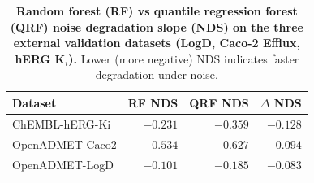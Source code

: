 
\begin{table}[H]
\centering
\caption{\textbf{\SuppFile{} Random forest (RF) vs quantile regression forest (QRF) noise degradation slope (NDS) on the three external validation datasets (LogD, Caco-2 Efflux, hERG K$_i$).}
Lower (more negative) NDS indicates faster degradation under noise.}
\label{supp:rf_vs_qrf_assay}
\small
\begin{tabular}{lrrr}
\toprule
\textbf{Dataset} & \textbf{RF NDS} & \textbf{QRF NDS} & \textbf{$\Delta$ NDS} \\
\midrule
ChEMBL-hERG-Ki     & $-0.231$ & $-0.359$ & $-0.128$ \\
OpenADMET-Caco2    & $-0.534$ & $-0.627$ & $-0.094$ \\
OpenADMET-LogD     & $-0.101$ & $-0.185$ & $-0.083$ \\
\bottomrule
\end{tabular}
\end{table}
